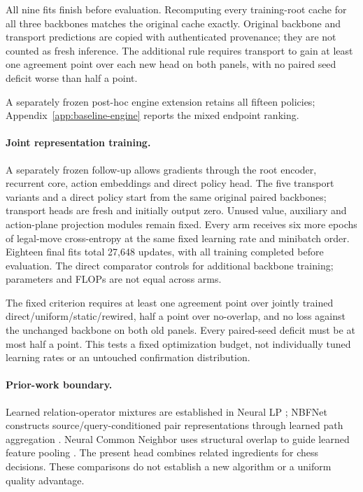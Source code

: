 All nine fits finish before evaluation. Recomputing every training-root cache
for all three backbones matches the original cache exactly. Original backbone
and transport predictions are copied with authenticated provenance; they are
not counted as fresh inference. The additional rule requires transport to gain
at least one agreement point over each new head on both panels, with no paired
seed deficit worse than half a point.

\RelationBaselineResults{}
A separately frozen post-hoc engine extension retains all fifteen policies;
Appendix~\ref{app:baseline-engine} reports the mixed endpoint ranking.

\paragraph{Joint representation training.}
A separately frozen follow-up allows gradients through the root encoder,
recurrent core, action embeddings and direct policy head. The five transport
variants and a direct policy start from the same original paired backbones;
transport heads are fresh and initially output zero. Unused value, auxiliary
and action-plane projection modules remain fixed. Every arm receives six more
epochs of legal-move cross-entropy at the same fixed learning rate and minibatch
order. Eighteen final fits total 27,648 updates, with all training completed
before evaluation. The direct comparator controls for additional backbone
training; parameters and FLOPs are not equal across arms.

The fixed criterion requires at least one agreement point over jointly trained
direct/uniform/static/rewired, half a point over no-overlap, and no loss against
the unchanged backbone on both old panels. Every paired-seed deficit must be
at most half a point. This tests a fixed optimization budget, not individually
tuned learning rates or an untouched confirmation distribution.

\JointResults{}

\paragraph{Prior-work boundary.}
Learned relation-operator mixtures are established in Neural LP
\citep{yang2017}; NBFNet constructs source/query-conditioned pair representations
through learned path aggregation \citep{zhu2021}. Neural Common Neighbor uses
structural overlap to guide learned feature pooling \citep{wang2024}. The
present head combines related ingredients for chess decisions.
\PathBaselineResult{}
These comparisons do not establish a new algorithm or a uniform quality advantage.
